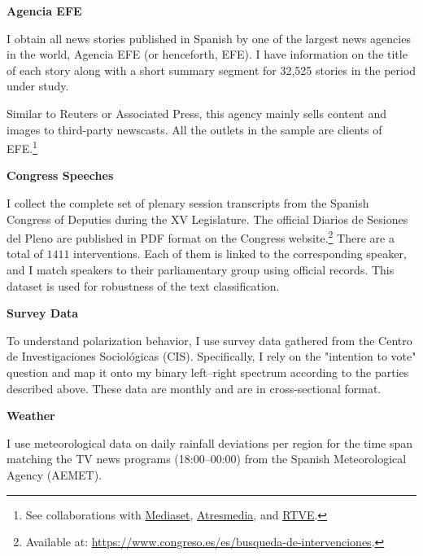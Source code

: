 \documentclass[12pt]{article}
\begin{document}
	

	
	\textbf{Agencia EFE}
	
	I obtain all news stories published in Spanish by one of the largest news agencies in the world, Agencia EFE (or henceforth, EFE). I have information on the title of each story along with a short summary segment for  32,525 stories in the period under study.
	
	Similar to Reuters or Associated Press, this agency mainly sells content and images to third-party newscasts. All the outlets in the sample are clients of  EFE.\footnote{See collaborations with \href{https://www.telecinco.es/autores/agencia-efe/}{Mediaset}, \href{https://cadenaser.com/nacional/2024/09/22/el-teletexto-una-herramienta-olvidada-que-aun-perdura-en-nuestras-televisiones-cadena-ser/}{Atresmedia}, and \href{https://www.rtve.es/rtve/20130301/rtve-agencia-efe-firman-convenio-colaboracion/611440.shtml}{RTVE}.} 


	\textbf{Congress Speeches}

 I collect the complete set of plenary session transcripts from the Spanish Congress of Deputies during the XV Legislature. The official Diarios de Sesiones del Pleno are published in PDF format on the Congress website.\footnote{Available at: \url{https://www.congreso.es/es/busqueda-de-intervenciones}.} There are a total of $1411$ interventions. Each of them is linked to the corresponding speaker, and I match speakers to their parliamentary group using official records. This dataset is used for robustness of the text classification. 

	
	\textbf{Survey Data}
	
	To understand polarization behavior, I use survey data gathered from the Centro de Investigaciones Sociológicas (CIS). Specifically, I rely on the "intention to vote" question and map it onto my binary left–right spectrum according to the parties described above. These data are monthly and are in cross-sectional format.
	
	\textbf{Weather}
	
	I use meteorological data on daily rainfall deviations per region for the time span matching the TV news programs (18:00–00:00) from the Spanish Meteorological Agency (AEMET).
	
\end{document}
